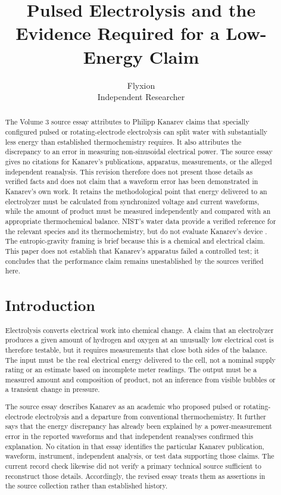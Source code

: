 \documentclass[11pt]{article}
\title{Pulsed Electrolysis and the Evidence Required for a Low-Energy Claim}
\author{Flyxion \\ \small Independent Researcher}
\date{}
\begin{document}
\maketitle

\begin{abstract}
The Volume 3 source essay attributes to Philipp Kanarev claims that specially configured pulsed or rotating-electrode electrolysis can split water with substantially less energy than established thermochemistry requires. It also attributes the discrepancy to an error in measuring non-sinusoidal electrical power. The source essay gives no citations for Kanarev's publications, apparatus, measurements, or the alleged independent reanalysis. This revision therefore does not present those details as verified facts and does not claim that a waveform error has been demonstrated in Kanarev's own work. It retains the methodological point that energy delivered to an electrolyzer must be calculated from synchronized voltage and current waveforms, while the amount of product must be measured independently and compared with an appropriate thermochemical balance. NIST's water data provide a verified reference for the relevant species and its thermochemistry, but do not evaluate Kanarev's device \cite{NISTWater}. The entropic-gravity framing is brief because this is a chemical and electrical claim. This paper does not establish that Kanarev's apparatus failed a controlled test; it concludes that the performance claim remains unestablished by the sources verified here.

\section{Introduction}

Electrolysis converts electrical work into chemical change. A claim that an electrolyzer produces a given amount of hydrogen and oxygen at an unusually low electrical cost is therefore testable, but it requires measurements that close both sides of the balance. The input must be the real electrical energy delivered to the cell, not a nominal supply rating or an estimate based on incomplete meter readings. The output must be a measured amount and composition of product, not an inference from visible bubbles or a transient change in pressure.

The source essay describes Kanarev as an academic who proposed pulsed or rotating-electrode electrolysis and a departure from conventional thermochemistry. It further says that the energy discrepancy has already been explained by a power-measurement error in the reported waveforms and that independent reanalyses confirmed this explanation. No citation in that essay identifies the particular Kanarev publication, waveform, instrument, independent analysis, or test data supporting those claims. The current record check likewise did not verify a primary technical source sufficient to reconstruct those details. Accordingly, the revised essay treats them as assertions in the source collection rather than established history.


\end{abstract}
\end{document}
